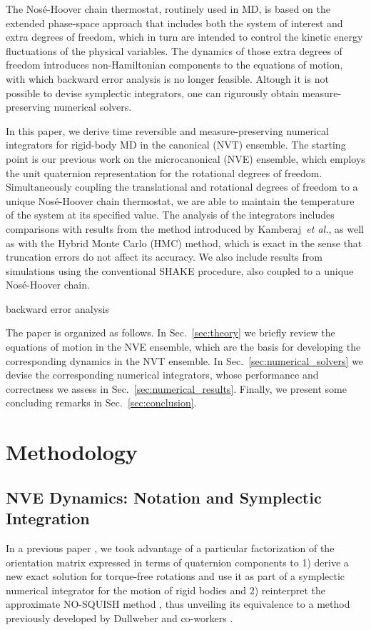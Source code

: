 \documentclass[
journal=jctcce,
layout=twocolumn
]{achemso}
\begin{document}
The Nos\'{e}-Hoover chain thermostat,\cite{Martyna_1992} routinely used in MD, is based on the extended phase-space approach that includes both the system of interest and extra degrees of freedom, which in turn are intended to control the kinetic energy fluctuations of the physical variables.
The dynamics of those extra degrees of freedom introduces non-Hamiltonian components to the equations of motion, with which backward error analysis is no longer feasible.
Altough it is not possible to devise symplectic integrators, one can rigurously obtain measure-preserving numerical solvers.\cite{Sergi_2001, Ezra_2004, Ezra_2006}

In this paper, we derive time reversible and measure-preserving numerical integrators for rigid-body MD in the canonical (NVT) ensemble.
The starting point is our previous work on the microcanonical (NVE) ensemble,\citep{Silveira_2017} which employs the unit quaternion representation for the rotational degrees of freedom.
Simultaneously coupling the translational and rotational degrees of freedom to a unique Nos\'{e}-Hoover chain thermostat, we are able to maintain the temperature of the system at its specified value.
The analysis of the integrators includes comparisons with results from the method introduced by Kamberaj~\textit{et al.},\cite{Kamberaj_2005} as well as with the Hybrid Monte Carlo (HMC) method,\cite{Duane_1987} which is exact in the sense that truncation errors do not affect its accuracy.
We also include results from simulations using the conventional SHAKE\cite{Ryckaert_1977} procedure, also coupled to a unique Nos\'{e}-Hoover chain.

backward error analysis

The paper is organized as follows.
In Sec.~\ref{sec:theory} we briefly review the equations of motion in the NVE ensemble, which are the basis for developing the corresponding dynamics in the NVT ensemble.
In Sec.~\ref{sec:numerical_solvers} we devise the corresponding numerical integrators, whose performance and correctness we assess in Sec.~\ref{sec:numerical_results}.
Finally, we present some concluding remarks in Sec.~\ref{sec:conclusion}.

\section{Methodology}
\label{sec:methodology}

\subsection{NVE Dynamics: Notation and Symplectic Integration}
\label{sec:nve}
In a previous paper \cite{Silveira_2017}, we took advantage of a particular factorization of the orientation matrix expressed in terms of quaternion components to
1) derive a new exact solution for torque-free rotations and use it as part of a symplectic numerical integrator for the motion of rigid bodies and
2) reinterpret the approximate NO-SQUISH method \cite{Miller_2002}, thus unveiling its equivalence to a method previously developed by Dullweber and co-workers \cite{Dullweber_1997}.
\end{document}
